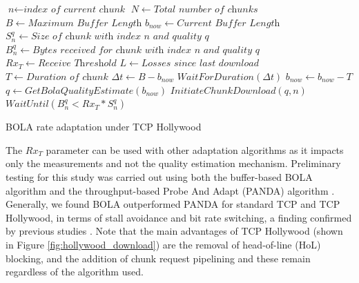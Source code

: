\begin{algorithm}
	\begin{algorithmic}[1]
		\State $\textit{n} \gets \textit{index of current chunk}$
		\State $N \gets \textit{Total number of chunks}$
		\State $B \gets \textit{Maximum Buffer Length}$
		\State $b_{now} \gets \textit{Current Buffer Length}$
		\State $S_n^q \gets \textit{Size of chunk with index n and quality q}$
		\State $B_n^q  \gets \textit{Bytes received for chunk with index n and quality q }$
		\State $Rx_T \gets \textit{Receive Threshold}$
		\State $L \gets \textit{Losses since last download}$
		\State $T \gets \textit{Duration of chunk}$
				\State $\Delta t \gets B - b_{now}$
				\State $WaitForDuration (\Delta t)$
			\EndIf
				\State $b_{now} \gets b_{now} - T$
			\EndIf
			\State ${q \gets GetBolaQualityEstimate(b_{now})}$		
			\State $InitiateChunkDownload(q, n)$
			\State $WaitUntil (B_n^q < Rx_T * S_n^q)$
		\EndWhile
		\EndProcedure
	\end{algorithmic}
	\caption{BOLA rate adaptation under TCP Hollywood}
	\label{algo:tcph_dash}
\end{algorithm}

The $Rx_{T}$ parameter can be used with other adaptation algorithms as it impacts only the measurements and not the quality estimation mechanism. Preliminary testing for this study was carried out using both the buffer-based BOLA algorithm and the throughput-based Probe And Adapt (PANDA) algorithm \cite{li2014probe}. Generally, we found BOLA outperformed PANDA for standard TCP and TCP Hollywood, in terms of stall avoidance and bit rate switching, a finding confirmed by previous studies \cite{karagkioules2017comparative}. Note that the main advantages of TCP Hollywood (shown in Figure \ref{fig:hollywood_download}) are the removal of head-of-line (HoL) blocking, and the addition of chunk request pipelining and these remain regardless of the algorithm used. 
